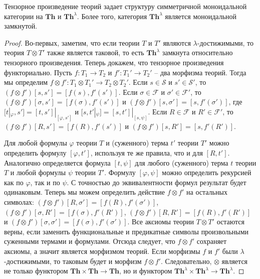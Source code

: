 \documentclass[reqno]{amsart}
\theoremstyle{definition}
\theoremstyle{remark}
\newcommand{\bcat}[1]{\mathbf{#1}}
\newcommand{\Th}{\bcat{Th}}
\begin{document}
\begin{prop}
Тензорное произведение теорий задает структуру симметричной моноидальной категории на $\Th$ и $\Th^\lambda$.
Более того, категория $\Th^\lambda$ является моноидальной замкнутой.
\end{prop}
\begin{proof}
Во-первых, заметим, что если теории $T$ и $T'$ являются $\lambda$-достижимыми, то теория $T \otimes T'$ также является таковой, то есть $\Th^\lambda$ замкнута относительно тензорного произведения.
Теперь докажем, что тензорное произведения функториально.
Пусть $f : T_1 \to T_2$ и $f' : T_1' \to T_2'$ -- два морфизма теорий.
Тогда мы определим $f \otimes f' : T_1 \otimes T_1' \to T_2 \otimes T_2'$.
Если $s \in \mathcal{S}$ и $s' \in \mathcal{S}'$, то $(f \otimes f')[s,s'] = [f(s),f'(s')]$.
Если $\sigma \in \mathcal{F}$ и $\sigma' \in \mathcal{F}'$, то $(f \otimes f')[\sigma,s'] = [f(\sigma),f'(s')]$ и $(f \otimes f')[s,\sigma'] = [s,f'(\sigma')]$, где $[t|_\varphi,s'] = [t,s']|_{[\varphi,s']}$ и $[s,t'|_\psi] = [s,t']|_{[s,\psi]}$.
Если $R \in \mathcal{F}$ и $R' \in \mathcal{F}'$, то $(f \otimes f')[R,s'] = [f(R),f'(s')]$ и $(f \otimes f')[s,R'] = [s,f'(R')]$.

Для любой формулы $\varphi$ теории $T$ и (суженного) терма $t'$ теории $T'$ можно определить формулу $[\varphi,t']$, используя те же правила, что и для $[R,t']$.
Аналогично определяется формула $[t,\psi]$ для любого (суженного) терма $t$ теории $T$ и любой формулы $\psi$ теории $T'$.
Формулу $[\varphi,\psi]$ можно определить рекурсией как по $\varphi$, так и по $\psi$.
С точностью до эквивалентности формул результат будет одинаковым.
Теперь мы можем определить действие $f \otimes f'$ на остальных символах: $(f \otimes f')[R,\sigma'] = [f(R),f'(\sigma')]$, $(f \otimes f')[\sigma,R'] = [f(\sigma),f'(R')]$, $(f \otimes f')[R,R'] = [f(R),f'(R')]$ и $(f \otimes f')[\sigma,\sigma'] = [f(\sigma),f'(\sigma')]$.
Все аксиомы теории $T \otimes T'$ остаются верны, если заменить функциональные и предикатные символы произвольными суженными термами и формулами.
Отсюда следует, что $f \otimes f'$ сохраняет аксиомы, а значит является морфизмом теорий.
Если морфизмы $f$ и $f'$ были $\lambda$-достижимыми, то таковым будет и морфизм $f \otimes f'$.
Следовательно, $\otimes$ является не только функтором $\Th \times \Th \to \Th$, но и функтором $\Th^\lambda \times \Th^\lambda \to \Th^\lambda$.


\end{proof}
\end{document}
